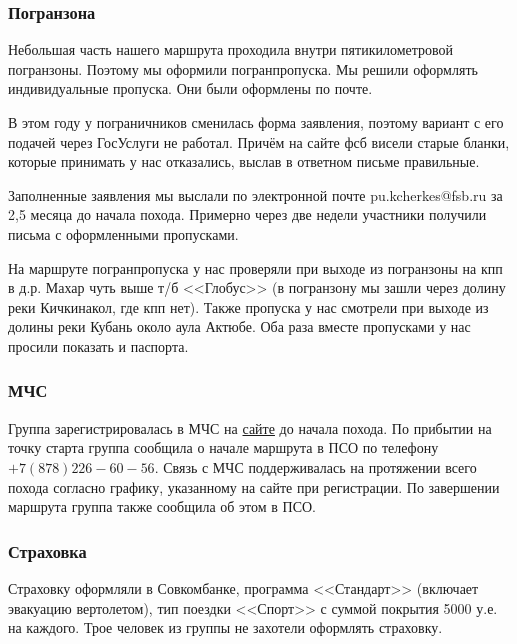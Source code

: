 			\setlength{\arrayrulewidth}{0.3mm}
			\setlength{\arraycolsep}{5pt}
			\renewcommand{\arraystretch}{1.8}

		\subsubsection{Погранзона}
			Небольшая часть нашего маршрута проходила внутри пятикилометровой погранзоны. Поэтому мы оформили
			погранпропуска. Мы решили оформлять индивидуальные пропуска. Они были оформлены по почте. 
			
			В этом году у пограничников сменилась форма заявления, поэтому вариант с его подачей через ГосУслуги
			не работал. Причём на сайте фсб висели старые бланки, которые принимать у нас отказались, выслав в
			ответном письме правильные.
			
			Заполненные заявления мы выслали по электронной почте pu.kcherkes@fsb.ru за 2,5 месяца до начала похода.
			Примерно через две недели участники получили письма с оформленными пропусками. 
			
			На маршруте погранпропуска у нас проверяли при выходе из погранзоны на кпп в д.р. Махар чуть выше
			т/б <<Глобус>> (в погранзону мы зашли через долину реки Кичкинакол, где кпп нет). Также пропуска
			у нас смотрели при выходе из долины реки Кубань около аула Актюбе. Оба раза вместе  пропусками у
			нас просили показать и паспорта.


		\subsubsection{МЧС}
			Группа зарегистрировалась в МЧС на \href{https://forms.mchs.gov.ru/registration_tourist_groups}{сайте}
			до начала похода. По прибытии на точку старта группа сообщила о начале маршрута в ПСО по телефону
			$+7 (878) 226-60-56$. Связь с МЧС поддерживалась на протяжении всего похода согласно графику, указанному
			на сайте при регистрации. По завершении маршрута группа также сообщила об этом в ПСО.

		\subsubsection{Страховка}
			Страховку оформляли в Совкомбанке, программа <<Стандарт>> (включает эвакуацию вертолетом), тип поездки
			<<Спорт>> с суммой покрытия 5000 у.е. на каждого. Трое человек из группы не захотели оформлять страховку.
 
